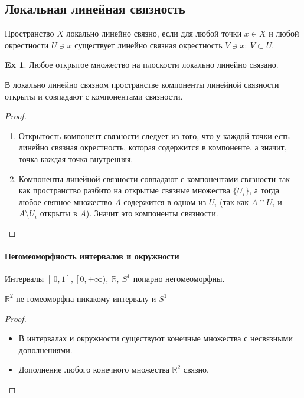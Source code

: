 \documentclass[11pt]{book}
\newcommand{\R}{\mathbb{R}}
\theoremstyle{definition}
\theoremstyle{plain}
\theoremstyle{plain}
\theoremstyle{definition}
\newtheorem*{ex}{Ex}
\theoremstyle{remark}
\begin{document}
\subsection{Локальная линейная связность}
\begin{defn}
    Пространство $ X$  локально линейно связно, если для любой точки  $ x \in  X$ и любой окрестности $ U \ni x$ существует линейно связная окрестность  $ V \ni x: ~ V \subset U$.
\end{defn}
\begin{ex}
    Любое открытое множество на плоскости локально линейно связано.
\end{ex}
\begin{thm}
    В локально линейно связном пространстве компоненты линейной связности открыты и совпадают с компонентами связности.
\end{thm}
\begin{proof}
    \begin{enumerate}
	\item Открытость компонент связности следует из того, что у каждой точки есть линейно связная окрестность, которая содержится в компоненте, а значит, точка каждая точка внутренняя.
	\item Компоненты линейной связности совпадают с компонентами связности так как пространство разбито на открытые связные множества $ \{U_i\}$, а тогда любое связное множество $ A$ содержится в одном из $ U_i$ (так как $ A \cap U_i$ и $ A \setminus U_i$ открыты в $ A$). Значит это компоненты связности.
    \end{enumerate}
\end{proof}
\paragraph{Негомеоморфность интервалов и окружности}
\begin{thm}
    Интервалы $ [\,0, 1], ~[\,0, +\infty),~ \R, ~S^{1} $ попарно негомеоморфны.
\end{thm}
\begin{thm}
    $ \R^2$ не гомеоморфна никакому интервалу и $ S^{1}$
\end{thm}
\begin{proof}
    $ $
    \begin{itemize}
	\item В интервалах и окружности существуют конечные множества с несвязными дополнениями.
	\item Дополнение любого конечного множества $ \R^2$ связно.
    \end{itemize}
\end{proof}
\end{document}
